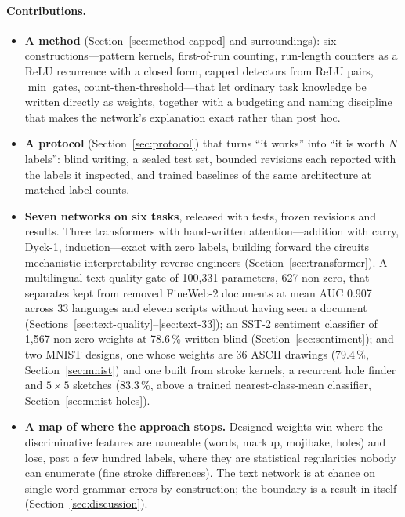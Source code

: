 \documentclass[11pt]{article}
\begin{document}
\paragraph{Contributions.}
\begin{itemize}
\item \textbf{A method} (Section~\ref{sec:method-capped} and surroundings): six
  constructions---pattern kernels, first-of-run counting, run-length counters as
  a ReLU recurrence with a closed form, capped detectors from ReLU pairs, $\min$
  gates, count-then-threshold---that let ordinary task knowledge be written
  directly as weights, together with a budgeting and naming discipline that
  makes the network's explanation exact rather than post hoc.
\item \textbf{A protocol} (Section~\ref{sec:protocol}) that turns ``it works''
  into ``it is worth $N$ labels'': blind writing, a sealed test set, bounded
  revisions each reported with the labels it inspected, and trained baselines
  of the same architecture at matched label counts.
\item \textbf{Seven networks on six tasks}, released with tests, frozen
  revisions and results. Three transformers with hand-written attention---addition
  with carry, Dyck-1, induction---exact with zero labels, building forward the
  circuits mechanistic interpretability reverse-engineers
  (Section~\ref{sec:transformer}). A multilingual text-quality gate of 100{,}331
  parameters, 627 non-zero, that separates kept from removed FineWeb-2 documents
  at mean AUC 0.907 across 33 languages and eleven scripts without having seen a
  document (Sections~\ref{sec:text-quality}--\ref{sec:text-33}); an SST-2
  sentiment classifier of 1{,}567 non-zero weights at 78.6\,\% written blind
  (Section~\ref{sec:sentiment}); and two MNIST designs, one whose weights are
  36 ASCII drawings (79.4\,\%, Section~\ref{sec:mnist}) and one built from
  stroke kernels, a recurrent hole finder and $5\times5$ sketches (83.3\,\%,
  above a trained nearest-class-mean classifier, Section~\ref{sec:mnist-holes}).
\item \textbf{A map of where the approach stops.} Designed weights win where
  the discriminative features are nameable (words, markup, mojibake, holes) and
  lose, past a few hundred labels, where they are statistical regularities
  nobody can enumerate (fine stroke differences). The text network is at chance
  on single-word grammar errors by construction; the boundary is a result in
  itself (Section~\ref{sec:discussion}).
\end{itemize}
\end{document}
